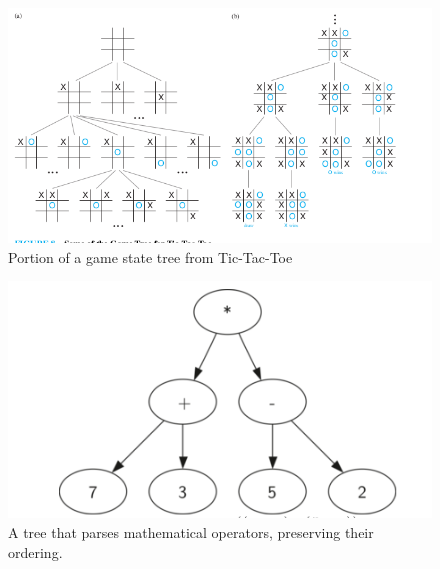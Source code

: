 \documentclass[a4paper,10pt]{article}
\begin{document}
\begin{figure}[H]
	\begin{centering}
	\begin{center}
	\includegraphics[width=\linewidth]{./game_states.png}
	\caption{Portion of a game state tree from Tic-Tac-Toe}
	\label{fig:game_state}
	\end{center}
	\par\end{centering}
\end{figure}

\begin{figure}[H]
	\begin{centering}
	\begin{center}
	\includegraphics[width=\linewidth]{./parse_tree.png}
	\caption{A tree that parses mathematical operators, preserving their ordering.}
	\label{fig:parse}
	\end{center}
	\par\end{centering}
\end{figure}
\end{document}

